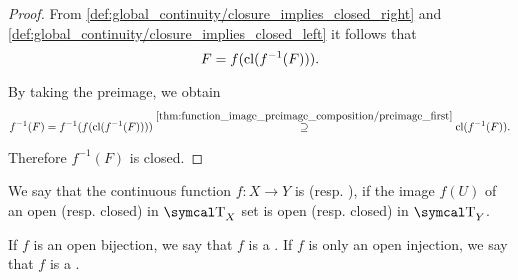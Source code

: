 \begin{proof}
  From \eqref{def:global_continuity/closure_implies_closed_right} and \eqref{def:global_continuity/closure_implies_closed_left} it follows that
  \begin{equation*}
    F = f(\operatorname{cl}(f^{-1}(F))).
  \end{equation*}

  By taking the preimage, we obtain
  \begin{equation*}
    f^{-1}(F)
    =
    f^{-1}(f(\operatorname{cl}(f^{-1}(F))))
    \overset {\ref{thm:function_image_preimage_composition/preimage_first}} \supseteq
    \operatorname{cl}(f^{-1}(F)).
  \end{equation*}

  Therefore \( f^{-1}(F) \) is closed.
\end{proof}

\begin{definition}\label{def:homeomorphism}
  We say that the continuous function \( f: X \to Y \) is  (resp. ), if the image \( f(U) \) of an open (resp. closed) in \( \CT_X \) set is open (resp. closed) in \( \CT_Y \).

  If \( f \) is an open bijection, we say that \( f \) is a . If \( f \) is only an open injection, we say that \( f \) is a .
\end{definition}

